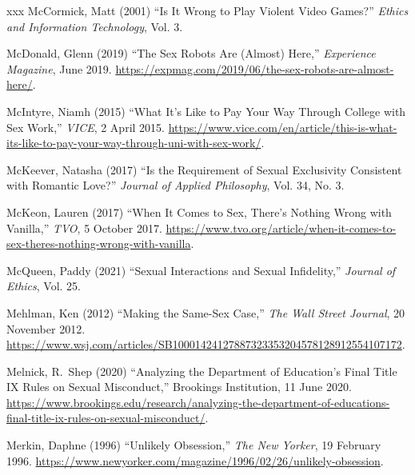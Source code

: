 \documentclass[]{jlreq} \usepackage{mystyle}
\begin{document}
\begin{thebibliography}{xxx}
McCormick, Matt (2001) ``Is It Wrong to Play Violent Video Games?'' \textit{
  Ethics and Information Technology}, Vol. 3.

McDonald, Glenn (2019) ``The Sex Robots Are (Almost) Here,'' \emph{Experience
  Magazine}, June 2019.
  \url{https://expmag.com/2019/06/the-sex-robots-are-almost-here/}.

McIntyre, Niamh (2015) ``What It's Like to Pay Your Way Through College with
  Sex Work,'' \emph{VICE}, 2 April 2015.
  \url{https://www.vice.com/en/article/this-is-what-its-like-to-pay-your-way-through-uni-with-sex-work/}.

McKeever, Natasha (2017) ``Is the Requirement of Sexual Exclusivity Consistent
  with Romantic Love?'' \textit{ Journal of Applied Philosophy}, Vol. 34, No.
  3.

McKeon, Lauren (2017) ``When It Comes to Sex, There's Nothing Wrong with
  Vanilla,'' \emph{TVO}, 5 October 2017.
  \url{https://www.tvo.org/article/when-it-comes-to-sex-theres-nothing-wrong-with-vanilla}.

McQueen, Paddy (2021) ``Sexual Interactions and Sexual Infidelity,'' \textit{
  Journal of Ethics}, Vol. 25.

Mehlman, Ken (2012) ``Making the Same-Sex Case,'' \emph{The Wall Street
  Journal}, 20 November 2012.
  \url{https://www.wsj.com/articles/SB10001424127887323353204578128912554107172}.

Melnick, R.~Shep (2020) ``Analyzing the Department of Education's Final Title
  IX Rules on Sexual Misconduct,'' Brookings Institution, 11 June 2020.
  \url{https://www.brookings.edu/research/analyzing-the-department-of-educations-final-title-ix-rules-on-sexual-misconduct/}.

Merkin, Daphne (1996) ``Unlikely Obsession,'' \emph{The New Yorker}, 19
  February 1996.
  \url{https://www.newyorker.com/magazine/1996/02/26/unlikely-obsession}.


\end{thebibliography}
\end{document}
